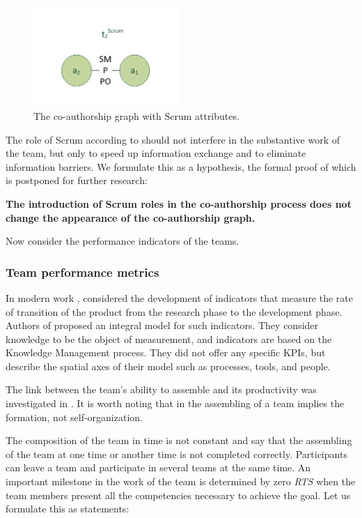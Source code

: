 \documentclass[12pt]{report}
\theoremstyle{definition}
\begin{document}
\begin{figure}[ht]
	\centering
	\includegraphics[width=0.5\textwidth]{scrum_fig11}
	\caption{The co-authorship graph with Scrum attributes.}
	\label{fig:ex11}
\end{figure}  

The role of Scrum according to \cite{fowler2001agile} should not interfere in the substantive work of the team, but only to speed up information exchange and to eliminate information barriers.
We formulate this as a hypothesis, the formal proof of which is postponed for further research:

\textbf{The introduction of Scrum roles in the co-authorship process does not change the appearance of the co-authorship graph.}

Now consider the performance indicators of the teams.

\subsubsection{Team performance metrics}

In modern work \cite{pereme2016toward}, considered the development of indicators that measure the rate of transition of the product from the research phase to the development phase. 
Authors of \cite{pereme2016toward} proposed an integral model for such indicators.  
They consider knowledge to be the object of measurement, and indicators are based on the Knowledge Management process.  
They did not offer any specific KPIs, but describe the spatial axes of their model such as processes, tools, and people.

The link between the team's ability to assemble and its productivity was investigated in \cite{edwards2006relationships}. 
It is worth noting that in \cite{edwards2006relationships} the assembling of a team implies the formation, not self-organization.

The composition of the team in time is not constant and say that the assembling of the team at one time or another time is not completed correctly.
Participants can leave a team and participate in several teams at the same time. 
An important milestone in the work of the team is determined by zero \emph{RTS} when the team members present all the competencies necessary to achieve the goal. 
Let us formulate this as statements:
\end{document}
